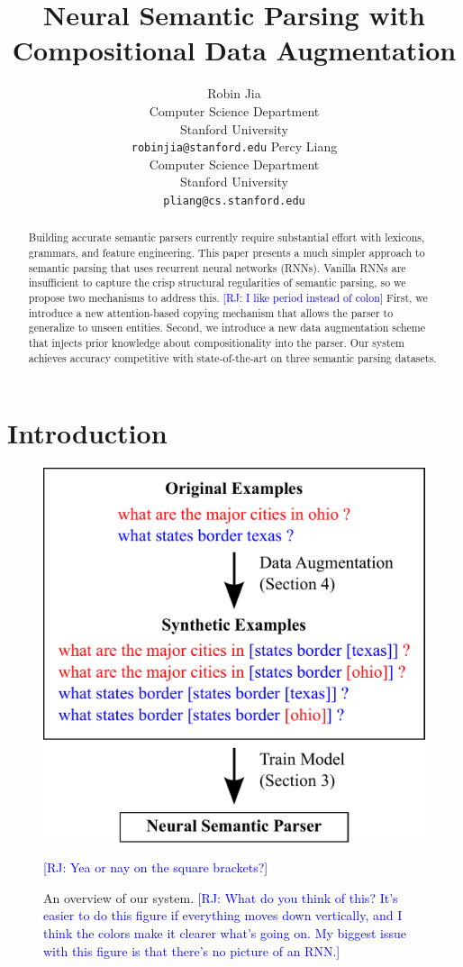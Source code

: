 \documentclass[11pt,letterpaper]{article}
\title{Neural Semantic Parsing with Compositional Data Augmentation}
\author{Robin Jia\\
	    Computer Science Department\\
      Stanford University\\
	    {\tt robinjia@stanford.edu}
	  \And
    Percy Liang\\
    Computer Science Department\\
  	Stanford University\\
  {\tt pliang@cs.stanford.edu}}
\date{}
\newcommand{\regex}{\textsc{Regex}\xspace}
\newcommand\rj[1]{\textcolor{blue}{[RJ: #1]}}
\begin{document}
\maketitle

\begin{abstract}
Building accurate semantic parsers currently require substantial effort
with lexicons, grammars, and feature engineering.
This paper presents a much simpler approach to semantic parsing that uses
recurrent neural networks (RNNs).
Vanilla RNNs are insufficient to capture the crisp structural regularities of
semantic parsing,
so we propose two mechanisms to address this.
\rj{I like period instead of colon}
First, we introduce a new attention-based copying mechanism that
allows the parser to generalize to unseen entities.
Second, we introduce a new data augmentation scheme
that injects prior knowledge about compositionality into the parser.
Our system achieves accuracy competitive with state-of-the-art
on three semantic parsing datasets.
\end{abstract}

\section{Introduction}
\begin{figure}[t] 
\small
\begin{center} 
  \includegraphics[scale=0.35]{fig-overview.pdf}
\end{center} 
\caption{An overview of our system.
  \rj{What do you think of this?  It's easier to do this figure
    if everything moves down vertically, and I think the colors
  make it clearer what's going on.
My biggest issue with this figure is that there's no picture of an RNN.}
}
\rj{Yea or nay on the square brackets?}
\label{fig:overview}
\end{figure}
\end{document}
